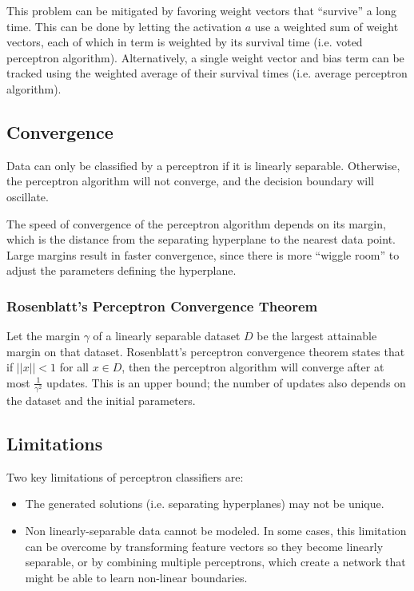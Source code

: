 \documentclass[12pt,titlepage]{article}
\begin{document}
        This problem can be mitigated by favoring weight vectors that ``survive'' a long time. This can be done by letting the activation $a$ use a weighted sum of
        weight vectors, each of which in term is weighted by its survival time (i.e. voted perceptron algorithm). Alternatively, a single weight vector and bias term
        can be tracked using the weighted average of their survival times (i.e. average perceptron algorithm).

    \subsection{Convergence}
      Data can only be classified by a perceptron if it is linearly separable. Otherwise, the perceptron algorithm will not converge, and the decision boundary will
      oscillate.

      The speed of convergence of the perceptron algorithm depends on its margin, which is the distance from the separating hyperplane to the nearest data point. Large
      margins result in faster convergence, since there is more ``wiggle room'' to adjust the parameters defining the hyperplane.

      \subsubsection{Rosenblatt's Perceptron Convergence Theorem}
        Let the margin $\gamma$ of a linearly separable dataset $D$ be the largest attainable margin on that dataset. Rosenblatt's perceptron convergence theorem states
        that if $||x|| < 1$ for all $x \in D$, then the perceptron algorithm will converge after at most $\frac{1}{\gamma^2}$ updates. This is an upper bound; the number
        of updates also depends on the dataset and the initial parameters.

    \subsection{Limitations}
      Two key limitations of perceptron classifiers are:
      \begin{itemize}
        \item The generated solutions (i.e. separating hyperplanes) may not be unique.
        \item Non linearly-separable data cannot be modeled. In some cases, this limitation can be overcome by transforming feature vectors so
          they become linearly separable, or by combining multiple perceptrons, which create a network that might be able to learn non-linear boundaries.
      \end{itemize}
\end{document}
